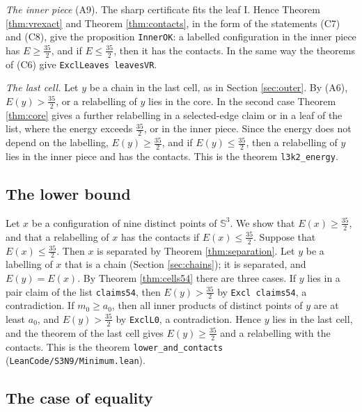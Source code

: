 \documentclass[reqno,a4paper,11pt]{amsart}
\numberwithin{equation}{section}
\newcommand{\Sph}{\mathbb{S}}
\newcommand{\lean}[1]{\texttt{#1}}
\newcommand{\file}[1]{\nolinkurl{#1}}
\begin{document}
\emph{The inner piece} (A9). The sharp certificate fits the leaf I. Hence Theorem \ref{thm:vrexact} and Theorem \ref{thm:contacts}, in the form of the statements (C7) and (C8), give the proposition \lean{InnerOK}: a labelled configuration in the inner piece has $E \geq \tfrac{35}{2}$, and if $E \leq \tfrac{35}{2}$, then it has the contacts. In the same way the theorems of (C6) give \lean{ExclLeaves leavesVR}.

\emph{The last cell.} Let $y$ be a chain in the last cell, as in Section \ref{sec:outer}. By (A6), $E(y) > \tfrac{35}{2}$, or a relabelling of $y$ lies in the core. In the second case Theorem \ref{thm:core} gives a further relabelling in a selected-edge claim or in a leaf of the list, where the energy exceeds $\tfrac{35}{2}$, or in the inner piece. Since the energy does not depend on the labelling, $E(y) \geq \tfrac{35}{2}$, and if $E(y) \leq \tfrac{35}{2}$, then a relabelling of $y$ lies in the inner piece and has the contacts. This is the theorem \lean{l3k2\_energy}.

\subsection{The lower bound}\label{sec:lower}

Let $x$ be a configuration of nine distinct points of $\Sph^3$. We show that $E(x) \geq \tfrac{35}{2}$, and that a relabelling of $x$ has the contacts if $E(x) \leq \tfrac{35}{2}$. Suppose that $E(x) \leq \tfrac{35}{2}$. Then $x$ is separated by Theorem \ref{thm:separation}. Let $y$ be a labelling of $x$ that is a chain (Section \ref{sec:chains}); it is separated, and $E(y) = E(x)$. By Theorem \ref{thm:cells54} there are three cases. If $y$ lies in a pair claim of the list \lean{claims54}, then $E(y) > \tfrac{35}{2}$ by \lean{Excl claims54}, a contradiction. If $m_0 \geq a_0$, then all inner products of distinct points of $y$ are at least $a_0$, and $E(y) > \tfrac{35}{2}$ by \lean{ExclL0}, a contradiction. Hence $y$ lies in the last cell, and the theorem of the last cell gives $E(y) \geq \tfrac{35}{2}$ and a relabelling with the contacts. This is the theorem \lean{lower\_and\_contacts} (\file{LeanCode/S3N9/Minimum.lean}).

\subsection{The case of equality}\label{sec:equality}
\end{document}
